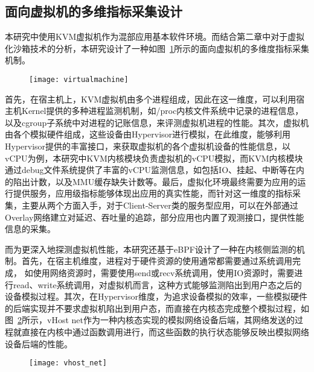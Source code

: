 \subsection{面向虚拟机的多维指标采集设计}


本研究中使用KVM虚拟机作为混部应用基本软件环境。而结合第二章中对于虚拟化沙箱技术的分析，本研究设计了一种如图~\ref{fig:virtualmachine}所示的面向虚拟机的多维度指标采集机制。

\begin{figure}[!htbp]
    \centering
    \texttt{[image: virtualmachine]}
    \label{fig:virtualmachine}
\end{figure}

首先，在宿主机上，KVM虚拟机由多个进程组成，因此在这一维度，可以利用宿主机Kernel提供的多种进程监测机制，如/proc内核文件系统中记录的进程信息，以及cgroup子系统中对进程的记账信息，来评测虚拟机进程的性能。其次，虚拟机由各个模拟硬件组成，这些设备由Hypervisor进行模拟，在此维度，能够利用Hypervisor提供的丰富接口，来获取虚拟机的各个虚拟机设备的性能信息，以vCPU为例，本研究中KVM内核模块负责虚拟机的vCPU模拟，而KVM内核模块通过debug文件系统提供了丰富的vCPU监测信息，如包括IO、挂起、中断等在内的陷出计数，以及MMU缓存缺失计数等。最后，虚拟化环境最终需要为应用的运行提供服务，应用级指标能够体现出应用的真实性能，而针对这一维度的指标采集，主要从两个方面入手，对于Client-Server类的服务型应用，可以在外部通过Overlay网络建立对延迟、吞吐量的追踪，部分应用也内置了观测接口，提供性能信息的采集。

而为更深入地探测虚拟机性能，本研究还基于eBPF设计了一种在内核侧监测的机制。首先，在宿主机维度，进程对于硬件资源的使用通常都需要通过系统调用完成， 如使用网络资源时，需要使用send或recv系统调用，使用IO资源时，需要进行read、write系统调用，对虚拟机而言，这种方式能够监测陷出到用户态之后的设备模拟过程。其次，在Hypervisor维度，为追求设备模拟的效率，一些模拟硬件的后端实现并不要求虚拟机陷出到用户态，而直接在内核态完成整个模拟过程，如图~\ref{fig:vhost_net}所示，vHost net作为一种内核态实现的模拟网络设备后端，其网络发送的过程就直接在内核中通过函数调用进行，而这些函数的执行状态能够反映出模拟网络设备后端的性能。

\begin{figure}[!htbp]
    \centering
    \texttt{[image: vhost\_net]}
    \label{fig:vhost_net}
\end{figure}

